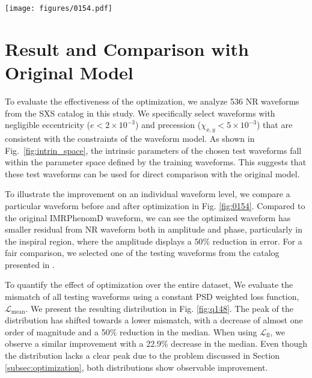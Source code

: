 \documentclass[twocolumn]{aastex631}
\begin{document}
\begin{figure*}[t]
	\centering
	\texttt{[image: figures/0154.pdf]}
	\caption{Comparison between original and optimized IMRPhenomD waveforms.
	Here shows the SXS:BBH:0154 NR waveform, which has mass ratio $q=1$ and
	$\chi_1=\chi_2=-0.8$. The original mismatch is around $2.8\times10^{-4}$ and
	the optimized mismatch is around $5.3\times10^{-5}$. Top: It shows the
	amplitude and phase of NR, original IMRPhenomD and optimized IMRPhenomD
	waveform. Bottom: It shows the relative error of amplitudes between NR and
	IMRPhenomD waveforms, and the absolute error of phases between NR and
	IMRPhenomD waveforms}
	\label{fig:0154}
\end{figure*}

\section{Result and Comparison with Original Model} \label{sec:result}

To evaluate the effectiveness of the optimization, we analyze 536 NR waveforms 
from the SXS catalog in this study. We specifically select waveforms with 
negligible eccentricity (${e<2\times10^{-3}}$) and precession 
(${\chi_{x,y}<5\times10^{-3}}$) that are consistent with the constraints of 
the waveform model. As shown in Fig.~\ref{fig:intrin_space}, the intrinsic 
parameters of the chosen test waveforms fall within the parameter space defined 
by the training waveforms. This suggests that these test waveforms can be used 
for direct comparison with the original model.

To illustrate the improvement on an individual waveform level, we compare a
particular waveform before and after optimization in Fig. \ref{fig:0154}.
Compared to the original IMRPhenomD waveform, we can see the optimized waveform
has smaller residual from NR waveform both in amplitude and phase, particularly
in the inspiral region, where the amplitude displays a $50\%$ reduction in
error. For a fair comparison, we selected one of the testing waveforms from the
catalog presented in \citep{khan2016frequency}.

To quantify the effect of optimization over the entire dataset, We evaluate the
mismatch of all testing waveforms using a constant PSD weighted loss function,
$\mathcal{L}_{\mathrm{mean}}$. We present the resulting distribution in Fig.
\ref{fig:q148}. The peak of the distribution has shifted towards a lower
mismatch, with a decrease of almost one order of magnitude and a 50\% reduction
in the median. When using $\mathcal{L}_{\mathrm{fl}}$, we observe a similar
improvement with a 22.9\% decrease in the median. Even though the distribution
lacks a clear peak due to the problem discussed in Section
\ref{subsec:optimization}, both distributions show observable improvement.
\end{document}
